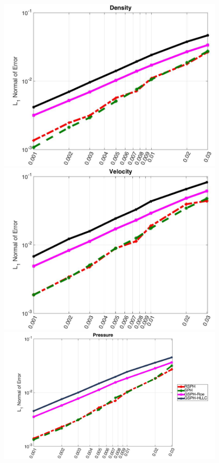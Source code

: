 \documentclass[review]{elsarticle}
\begin{document}
\begin{figure}[H]
    \centering
    \begin{minipage}{.30\textwidth}
        \centering
        \includegraphics[width=0.99 \textwidth]{./Figures/Accuracy-des}
    \end{minipage}%
    \begin{minipage}{.30 \textwidth}
        \centering
        \includegraphics[width=0.99 \textwidth]{./Figures/Accuracy-vel}
    \end{minipage}%
    \begin{minipage}{.39\textwidth}
        \centering
        \includegraphics[width=0.99 \textwidth]{./Figures/Accuracy-pre}

\end{minipage}
\end{figure}
\end{document}
